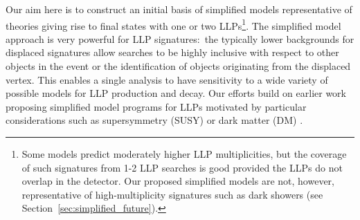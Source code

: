 Our aim here is to construct an initial basis of simplified models representative of theories giving rise to final states with one or two LLPs\footnote{Some models predict moderately higher LLP multiplicities, but the coverage of such signatures from 1-2 LLP searches is good provided the LLPs do not overlap in the detector. Our proposed simplified models are not, however, representative of high-multiplicity signatures such as dark showers (see Section~\ref{sec:simplified_future}).}.  The simplified model approach is very powerful for LLP signatures:~the typically lower backgrounds for displaced signatures allow searches to be highly inclusive with respect to other objects in the event or the identification of objects originating from the displaced vertex. This enables a single analysis to have sensitivity to a wide variety of possible models for LLP production and decay. Our efforts build on earlier work proposing simplified model programs for LLPs motivated by particular considerations such as supersymmetry (SUSY) or dark matter (DM) \cite{Heisig:2012zq,Liu:2015bma,Heisig:2015yla,Khoze:2017ixx,Mahbubani:2017gjh,Buchmueller:2017uqu}. 

